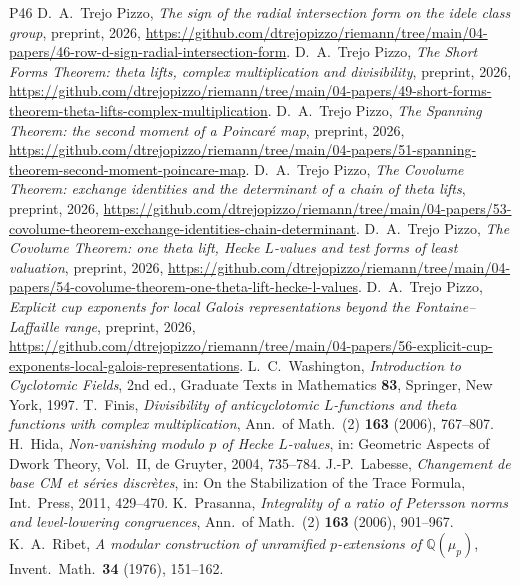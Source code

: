 \documentclass[10pt]{amsart}
\theoremstyle{definition}
\theoremstyle{remark}
\begin{document}
\begin{thebibliography}{P46}
 D.~A.~Trejo Pizzo, \emph{The sign of the radial intersection form on the idele class group}, preprint, 2026, \url{https://github.com/dtrejopizzo/riemann/tree/main/04-papers/46-row-d-sign-radial-intersection-form}.
 D.~A.~Trejo Pizzo, \emph{The Short Forms Theorem: theta lifts, complex multiplication and divisibility}, preprint, 2026, \url{https://github.com/dtrejopizzo/riemann/tree/main/04-papers/49-short-forms-theorem-theta-lifts-complex-multiplication}.
 D.~A.~Trejo Pizzo, \emph{The Spanning Theorem: the second moment of a Poincar\'e map}, preprint, 2026, \url{https://github.com/dtrejopizzo/riemann/tree/main/04-papers/51-spanning-theorem-second-moment-poincare-map}.
 D.~A.~Trejo Pizzo, \emph{The Covolume Theorem: exchange identities and the determinant of a chain of theta lifts}, preprint, 2026, \url{https://github.com/dtrejopizzo/riemann/tree/main/04-papers/53-covolume-theorem-exchange-identities-chain-determinant}.
 D.~A.~Trejo Pizzo, \emph{The Covolume Theorem: one theta lift, Hecke $L$-values and test forms of least valuation}, preprint, 2026, \url{https://github.com/dtrejopizzo/riemann/tree/main/04-papers/54-covolume-theorem-one-theta-lift-hecke-l-values}.
 D.~A.~Trejo Pizzo, \emph{Explicit cup exponents for local Galois representations beyond the Fontaine--Laffaille range}, preprint, 2026, \url{https://github.com/dtrejopizzo/riemann/tree/main/04-papers/56-explicit-cup-exponents-local-galois-representations}.
 L.~C.~Washington, \emph{Introduction to Cyclotomic Fields}, 2nd ed.,
Graduate Texts in Mathematics \textbf{83}, Springer, New York, 1997.
 T.~Finis, \emph{Divisibility of anticyclotomic $L$-functions and theta functions
with complex multiplication}, Ann.\ of Math.\ (2) \textbf{163} (2006), 767--807.
 H.~Hida, \emph{Non-vanishing modulo $p$ of Hecke $L$-values}, in:
Geometric Aspects of Dwork Theory, Vol.~II, de Gruyter, 2004, 735--784.
 J.-P.~Labesse, \emph{Changement de base CM et s\'eries discr\`etes}, in: On the
Stabilization of the Trace Formula, Int.\ Press, 2011, 429--470.
 K.~Prasanna, \emph{Integrality of a ratio of Petersson norms and
level-lowering congruences}, Ann.\ of Math.\ (2) \textbf{163} (2006), 901--967.
 K.~A.~Ribet, \emph{A modular construction of unramified $p$-extensions of
$\mathbb Q(\mu_p)$}, Invent.\ Math.\ \textbf{34} (1976), 151--162.

\end{thebibliography}
\end{document}
